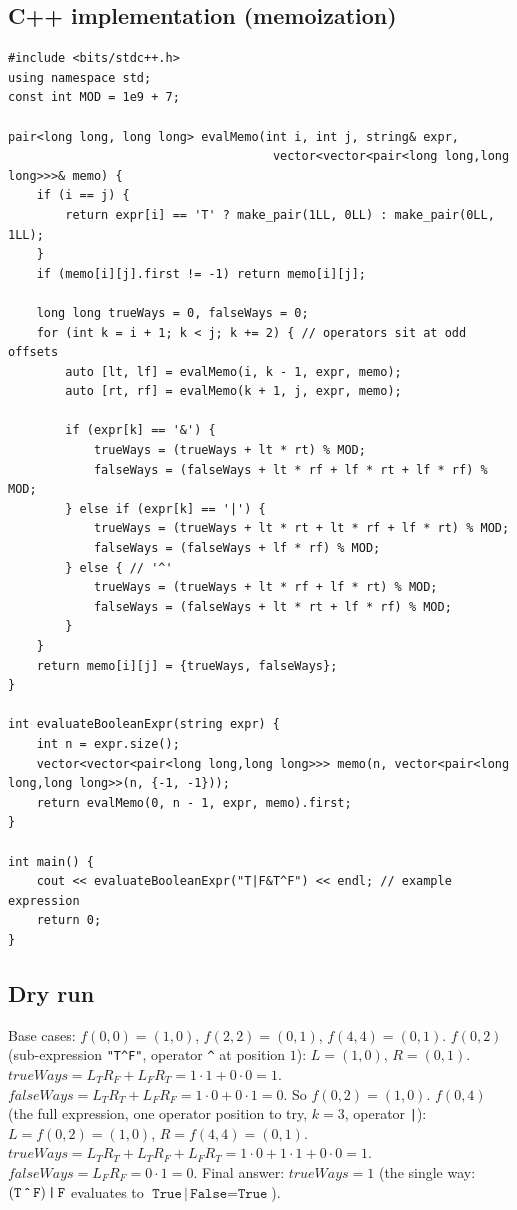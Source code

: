 \subsection*{C++ implementation (memoization)}

\begin{lstlisting}
#include <bits/stdc++.h>
using namespace std;
const int MOD = 1e9 + 7;

pair<long long, long long> evalMemo(int i, int j, string& expr,
                                     vector<vector<pair<long long,long long>>>& memo) {
    if (i == j) {
        return expr[i] == 'T' ? make_pair(1LL, 0LL) : make_pair(0LL, 1LL);
    }
    if (memo[i][j].first != -1) return memo[i][j];

    long long trueWays = 0, falseWays = 0;
    for (int k = i + 1; k < j; k += 2) { // operators sit at odd offsets
        auto [lt, lf] = evalMemo(i, k - 1, expr, memo);
        auto [rt, rf] = evalMemo(k + 1, j, expr, memo);

        if (expr[k] == '&') {
            trueWays = (trueWays + lt * rt) % MOD;
            falseWays = (falseWays + lt * rf + lf * rt + lf * rf) % MOD;
        } else if (expr[k] == '|') {
            trueWays = (trueWays + lt * rt + lt * rf + lf * rt) % MOD;
            falseWays = (falseWays + lf * rf) % MOD;
        } else { // '^'
            trueWays = (trueWays + lt * rf + lf * rt) % MOD;
            falseWays = (falseWays + lt * rt + lf * rf) % MOD;
        }
    }
    return memo[i][j] = {trueWays, falseWays};
}

int evaluateBooleanExpr(string expr) {
    int n = expr.size();
    vector<vector<pair<long long,long long>>> memo(n, vector<pair<long long,long long>>(n, {-1, -1}));
    return evalMemo(0, n - 1, expr, memo).first;
}

int main() {
    cout << evaluateBooleanExpr("T|F&T^F") << endl; // example expression
    return 0;
}
\end{lstlisting}

\subsection*{Dry run}


Base cases: $f(0,0)=(1,0)$, $f(2,2)=(0,1)$, $f(4,4)=(0,1)$.
$f(0,2)$ (sub-expression \texttt{"T\^{}F"}, operator \texttt{\^{}} at
position $1$): $L=(1,0)$, $R=(0,1)$.
$\textit{trueWays}=L_T R_F+L_F R_T=1\cdot1+0\cdot0=1$.
$\textit{falseWays}=L_T R_T+L_F R_F=1\cdot0+0\cdot1=0$. So
$f(0,2)=(1,0)$. $f(0,4)$ (the full expression, one operator position
to try, $k=3$, operator \texttt{|}): $L=f(0,2)=(1,0)$, $R=f(4,4)=(0,1)$.
$\textit{trueWays}=L_T R_T+L_T R_F+L_F R_T=1\cdot0+1\cdot1+0\cdot0=1$.
$\textit{falseWays}=L_F R_F=0\cdot1=0$. Final answer:
$\textit{trueWays}=1$ (the single way: $(\texttt{T}\,\texttt{\^{}}\,
\texttt{F})\,\texttt{|}\,\texttt{F}$ evaluates to
$\texttt{True}\,\texttt{|}\,\texttt{False}=\texttt{True}$).

